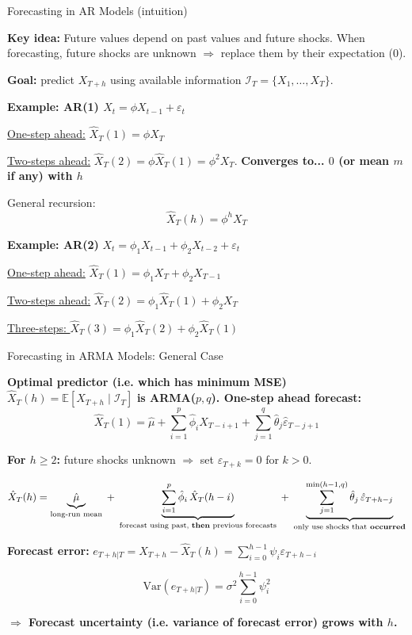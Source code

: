 \documentclass{beamer}
\begin{document}
\begin{frame}{Forecasting in AR Models (intuition)}
\small

\textbf{Key idea:} Future values depend on past values and future shocks.  
When forecasting, future shocks are unknown $\Rightarrow$ replace them by their expectation (0).

\textbf{Goal:} predict $X_{T+h}$ using available information $\mathcal{I}_T = \{X_1,\dots,X_T\}$.

\medskip
\textbf{Example: AR(1) $X_t = \phi X_{t-1} + \varepsilon_t$}

\underline{One-step ahead:} $\hat X_{T}(1) = \phi X_T$

\underline{Two-steps ahead:} $\hat X_{T}(2) = \phi \hat X_{T}(1) = \phi^2 X_T$. \textbf{Converges to... $0$ (or mean $m$ if any) with $h$}

General recursion:
\[
\hat X_{T}(h) = \phi^h X_T
\]

\medskip
\textbf{Example: AR(2)} $X_t = \phi_1 X_{t-1} + \phi_2 X_{t-2} + \varepsilon_t$

\underline{One-step ahead:} $\hat X_{T}(1) = \phi_1 X_T + \phi_2 X_{T-1}$ 

\underline{Two-steps ahead:} $\hat X_{T}(2) = \phi_1 \hat X_{T}(1) + \phi_2 X_T$

\underline{Three-steps: $\hat X_{T}(3) = \phi_1 \hat X_{T}(2) + \phi_2 \hat X_{T}(1)$}

\end{frame}

\begin{frame}{Forecasting in ARMA Models: General Case}
\small

\textbf{Optimal predictor (i.e. which has minimum MSE)} $\hat{X}_{T}(h) = \mathbb{E}[X_{T+h} \mid \mathcal{I}_T]$
\textbf{is ARMA($p,q$). One-step ahead forecast:}
\[
\hat{X}_{T}(1)
= \hat\mu
+ \sum_{i=1}^{p} \hat\phi_i X_{T-i+1}
+ \sum_{j=1}^{q} \hat\theta_j \hat\varepsilon_{T-j+1}
\]

\medskip
\textbf{For $h \ge 2$:} future shocks unknown $\Rightarrow$ set $\varepsilon_{T+k}=0$ for $k>0$.

\[
\hat X_T(h)
=
\underbrace{\hat\mu}_{\text{long-run mean}}
\;+\;
\underbrace{\sum_{i=1}^{p} \hat\phi_i \, \hat X_T(h-i)}_{\text{forecast using past, \textbf{then} previous forecasts}}
\;+\;
\underbrace{\sum_{j=1}^{\min(h-1,q)} \hat\theta_j \, \hat\varepsilon_{T+h-j}}_{\text{only use shocks that\textbf{ occurred}}}
\]


\medskip
\textbf{Forecast error:} $e_{T+h|T}
= X_{T+h} - \hat X_T(h)
= \sum_{i=0}^{h-1} \psi_i \varepsilon_{T+h-i}$

\[
\mathrm{Var}(e_{T+h|T})
= \sigma^2 \sum_{i=0}^{h-1} \psi_i^2
\]

\textbf{$\Rightarrow$ Forecast uncertainty (i.e. variance of forecast error) grows with $h$.}
\end{frame}
\end{document}
